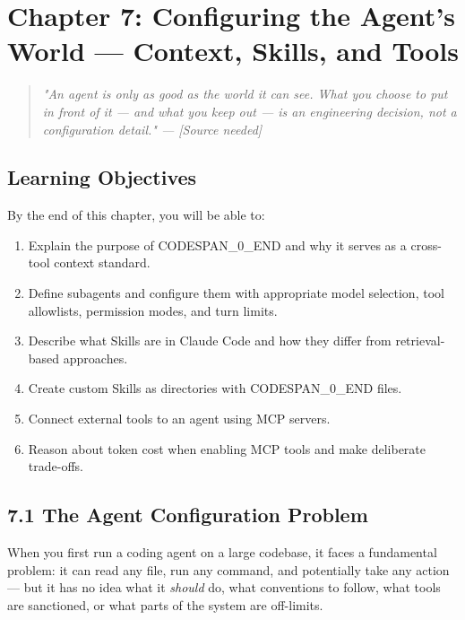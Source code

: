 \documentclass[11pt,a4paper]{book}
\begin{document}

\chapter{Chapter 7: Configuring the Agent's World --- Context, Skills, and Tools}

\begin{quote}
\textit{\textit{"An agent is only as good as the world it can see. What you choose to put in front of it --- and what you keep out --- is an engineering decision, not a configuration detail."} --- [Source needed]}
\end{quote}

\medskip

\section{Learning Objectives}

By the end of this chapter, you will be able to:

\begin{enumerate}
  \item Explain the purpose of CODESPAN\_0\_END and why it serves as a cross-tool context standard.
  \item Define subagents and configure them with appropriate model selection, tool allowlists, permission modes, and turn limits.
  \item Describe what Skills are in Claude Code and how they differ from retrieval-based approaches.
  \item Create custom Skills as directories with CODESPAN\_0\_END files.
  \item Connect external tools to an agent using MCP servers.
  \item Reason about token cost when enabling MCP tools and make deliberate trade-offs.
\end{enumerate}

\medskip

\section{7.1 The Agent Configuration Problem}

When you first run a coding agent on a large codebase, it faces a fundamental problem: it can read any file, run any command, and potentially take any action --- but it has no idea what it \textit{should} do, what conventions to follow, what tools are sanctioned, or what parts of the system are off-limits.
\end{document}
